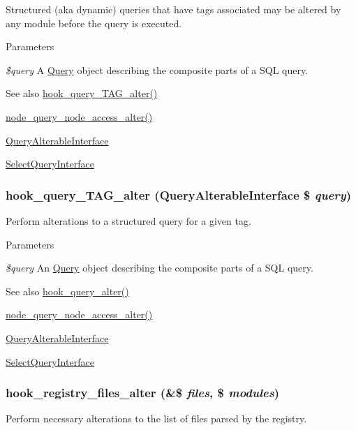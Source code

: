 Structured (aka dynamic) queries that have tags associated may be altered by any module before the query is executed.


\begin{DoxyParams}{Parameters}
\item[{\em \$query}]A \hyperlink{classQuery}{Query} object describing the composite parts of a SQL query.\end{DoxyParams}
\begin{DoxySeeAlso}{See also}
\hyperlink{group__hooks_ga12527037deeb76adcab1000e984fdfce}{hook\_\-query\_\-TAG\_\-alter()} 

\hyperlink{group__node__access_gaef7c83544718b8431d81b884ef8cc6f5}{node\_\-query\_\-node\_\-access\_\-alter()} 

\hyperlink{interfaceQueryAlterableInterface}{QueryAlterableInterface} 

\hyperlink{interfaceSelectQueryInterface}{SelectQueryInterface} 
\end{DoxySeeAlso}
\hypertarget{group__hooks_ga12527037deeb76adcab1000e984fdfce}{
\subsubsection[{hook\_\-query\_\-TAG\_\-alter}]{\setlength{\rightskip}{0pt plus 5cm}hook\_\-query\_\-TAG\_\-alter ({\bf QueryAlterableInterface} \$ {\em query})}}
\label{group__hooks_ga12527037deeb76adcab1000e984fdfce}
Perform alterations to a structured query for a given tag.


\begin{DoxyParams}{Parameters}
\item[{\em \$query}]An \hyperlink{classQuery}{Query} object describing the composite parts of a SQL query.\end{DoxyParams}
\begin{DoxySeeAlso}{See also}
\hyperlink{group__hooks_gaf166f6375e9f7b5919d719eb91198d47}{hook\_\-query\_\-alter()} 

\hyperlink{group__node__access_gaef7c83544718b8431d81b884ef8cc6f5}{node\_\-query\_\-node\_\-access\_\-alter()} 

\hyperlink{interfaceQueryAlterableInterface}{QueryAlterableInterface} 

\hyperlink{interfaceSelectQueryInterface}{SelectQueryInterface} 
\end{DoxySeeAlso}
\hypertarget{group__hooks_ga5b1201bb1afca26333900cd9aca6a2de}{
\subsubsection[{hook\_\-registry\_\-files\_\-alter}]{\setlength{\rightskip}{0pt plus 5cm}hook\_\-registry\_\-files\_\-alter (\&\$ {\em files}, \/  \$ {\em modules})}}
\label{group__hooks_ga5b1201bb1afca26333900cd9aca6a2de}
Perform necessary alterations to the list of files parsed by the registry.

